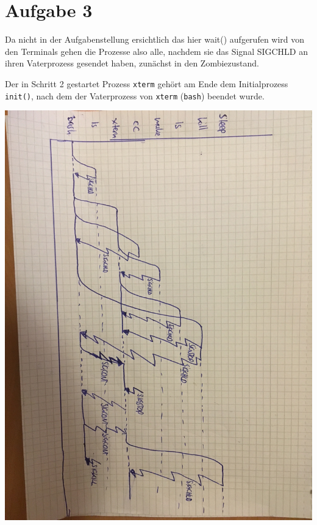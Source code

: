 \documentclass{ti2}
\begin{document}
\newpage

\section*{Aufgabe 3}
Da nicht in der Aufgabenstellung ersichtlich das hier wait() aufgerufen wird von den Terminals gehen die Prozesse also alle, nachdem sie das Signal SIGCHLD an ihren Vaterprozess gesendet haben, zunächst in den Zombiezustand.

Der in Schritt 2 gestartet Prozess \texttt{xterm} gehört am Ende dem Initialprozess \texttt{init()}, nach dem der Vaterprozess von \texttt{xterm} (\texttt{bash}) beendet wurde.

\includegraphics[width=18cm]{aufg3.JPG}
\end{document}
